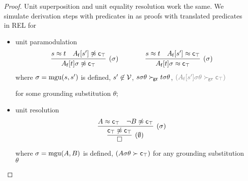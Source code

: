     \begin{proof}
        Unit superposition and unit equality resolution work the same.
        We simulate derivation steps with predicates in \InstGenEQ{}
        as proofs with translated predicates in REL for
        \begin{itemize}
            \item unit paramodulation
            \begin{gather*}
                \infer
                [ (\sigma) ]
                {A_\mf[t]\sigma\mNE\mc_\top}
                {s\mEQ t&A_\mf[s']\mNE\mc_\top}
                \qquad\qquad
                \infer
                [ (\sigma)  ]
                {A_\mf[t]\sigma\mEQ \mc_\top}
                {s\mEQ t&A_\mf[s']\mEQ \mc_\top}
                \end{gather*}
            where \( \sigma=\operatorname{mgu}(s,s') \) is defined,
            \( s'\not\in\mathcal{V} \),
            \( s\sigma\theta\mathrel\succ_{\!\mathtt{gr}} t\sigma\theta \),
            \( \textcolor{colG}{(A_\mf[s']\sigma\theta\succG\mc_\top)} \)

            for some grounding substitution \( \theta \);

            \item %
            unit resolution
            \begin{gather*}
                \infer[(\sigma)]
                {
                    \infer[(\emptyset)]
                    {\emptyclause}
                    {\mc_\top \mNE \mc_\top}
                    }
                {A\mEQ\mc_\top & \lnot B\mNE\mc_\top}
            \end{gather*}
            where \( \sigma=\operatorname{mgu}(A,B) \) is defined,
            \textcolor{colG}{
                \( (A\sigma\theta\succ\mathsf{c}_\top) \)
                for any grounding substitution \( \theta \)
            }
        \end{itemize}
    \end{proof}














